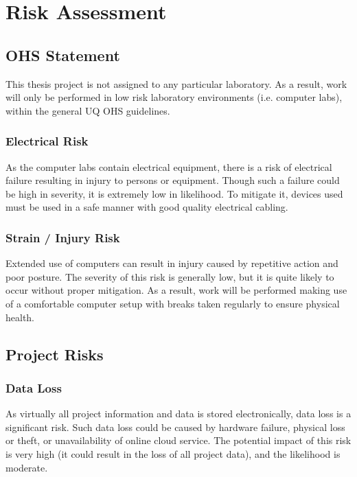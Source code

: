 \section{Risk Assessment}

\subsection{OHS Statement}

This thesis project is not assigned to any particular laboratory. As a result, work will only be performed in low risk laboratory environments (i.e. computer labs), within the general UQ OHS guidelines.

\subsubsection{Electrical Risk}

As the computer labs contain electrical equipment, there is a risk of electrical failure resulting in injury to persons or equipment. Though such a failure could be high in severity, it is extremely low in likelihood. To mitigate it, devices used must be used in a safe manner with good quality electrical cabling.

\subsubsection{Strain / Injury Risk}

Extended use of computers can result in injury caused by repetitive action and poor posture. The severity of this risk is generally low, but it is quite likely to occur without proper mitigation. As a result, work will be performed making use of a comfortable computer setup with breaks taken regularly to ensure physical health.

\subsection{Project Risks}

\subsubsection{Data Loss}

As virtually all project information and data is stored electronically, data loss is a significant risk. Such data loss could be caused by hardware failure, physical loss or theft, or unavailability of online cloud service. The potential impact of this risk is very high (it could result in the loss of all project data), and the likelihood is moderate.

